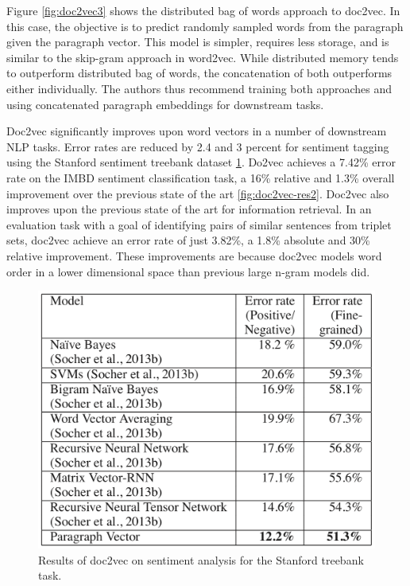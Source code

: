 Figure \ref{fig:doc2vec3} shows the distributed bag of words approach to doc2vec. In this case, the objective is to predict randomly sampled words from the paragraph given the paragraph vector. This model is simpler, requires less storage, and is similar to the skip-gram approach in word2vec. While distributed memory tends to outperform distributed bag of words, the concatenation of both outperforms either individually. The authors thus recommend training both approaches and using concatenated paragraph embeddings for downstream tasks.

Doc2vec significantly improves upon word vectors in a number of downstream NLP tasks. Error rates are reduced by 2.4 and 3 percent for sentiment tagging using the Stanford sentiment treebank dataset \ref{fig:doc2vec-res1}. Do2vec achieves a 7.42\% error rate on the IMBD sentiment classification task, a 16\% relative and 1.3\% overall improvement over the previous state of the art \ref{fig:doc2vec-res2}. Doc2vec also improves upon the previous state of the art for information retrieval. In an evaluation task with a goal of identifying pairs of similar sentences from triplet sets, doc2vec achieve an error rate of just 3.82\%, a 1.8\% absolute and 30\% relative improvement. These improvements are because doc2vec models word order in a lower dimensional space than previous large n-gram models did.


\begin{figure}
\centering
  \includegraphics[width=.7\linewidth]{files/doc2vec-4.png}
  \caption{Results of doc2vec on sentiment analysis for the Stanford treebank task.}
  \label{fig:doc2vec-res1}
\end{figure}

